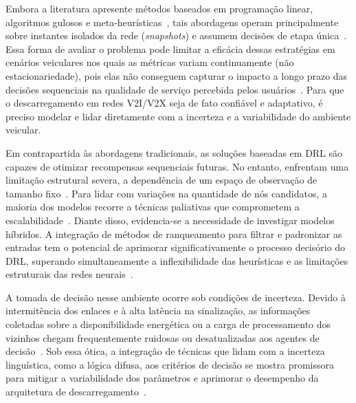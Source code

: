 
Embora a literatura apresente métodos baseados em programação linear, algoritmos gulosos e meta-heurísticas~\cite{li2020genetic,you2021efficient}, tais abordagens operam principalmente sobre instantes isolados da rede (\textit{snapshots}) e assumem decisões de etapa única~\cite{xiang2025}. Essa forma de avaliar o problema pode limitar a eficácia dessas estratégias em cenários veiculares nos quais as métricas variam continuamente (não estacionariedade), pois elas não conseguem capturar o impacto a longo prazo das decisões sequenciais na qualidade de serviço percebida pelos usuários~\cite{uddin2025,cao2024survey}. Para que o descarregamento em redes \gls{V2I}/\gls{V2X} seja de fato confiável e adaptativo, é preciso modelar e lidar diretamente com a incerteza e a variabilidade do ambiente veicular.

Em contrapartida às abordagens tradicionais, as soluções baseadas em \gls{DRL} são capazes de otimizar recompensas sequenciais futuras. No entanto, enfrentam uma limitação estrutural severa, a dependência de um espaço de observação de tamanho fixo~\cite{uddin2025}. Para lidar com variações na quantidade de nós candidatos, a maioria dos modelos recorre a técnicas paliativas que comprometem a escalabilidade~\cite{miriyala2026}. Diante disso, evidencia-se a necessidade de investigar modelos híbridos. A integração de métodos de ranqueamento para filtrar e padronizar as entradas tem o potencial de aprimorar significativamente o processo decisório do \gls{DRL}, superando simultaneamente a inflexibilidade das heurísticas e as limitações estruturais das redes neurais~\cite{vieira2025}.

A tomada de decisão nesse ambiente ocorre sob condições de incerteza. Devido à intermitência dos enlaces e à alta latência na sinalização, as informações coletadas sobre a disponibilidade energética ou a carga de processamento dos vizinhos chegam frequentemente ruidosas ou desatualizadas aos agentes de decisão~\cite{uddin2025}. Sob essa ótica, a integração de técnicas que lidam com a incerteza linguística, como a lógica difusa, aos critérios de decisão se mostra promissora para mitigar a variabilidade dos parâmetros e aprimorar o desempenho da arquitetura de descarregamento~\cite{vieira2025, vemireddy2021}.

